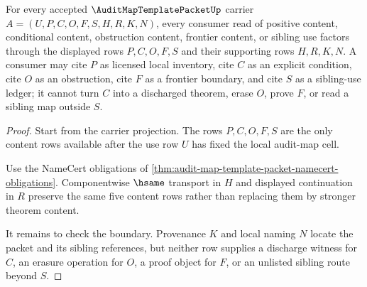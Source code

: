 \begin{theorem}
\label{thm:audit-map-template-packet-positive-conditional-obstruction-frontier}
For every accepted $\AuditMapTemplatePacketUp$ carrier $A=(U,P,C,O,F,S,H,R,K,N)$, every consumer read of positive content, conditional content, obstruction content, frontier content, or sibling use factors through the displayed rows $P,C,O,F,S$ and their supporting rows $H,R,K,N$. A consumer may cite $P$ as licensed local inventory, cite $C$ as an explicit condition, cite $O$ as an obstruction, cite $F$ as a frontier boundary, and cite $S$ as a sibling-use ledger; it cannot turn $C$ into a discharged theorem, erase $O$, prove $F$, or read a sibling map outside $S$.
\end{theorem}
\begin{proof}
Start from the carrier projection. The rows $P,C,O,F,S$ are the only content rows available after the use row $U$ has fixed the local audit-map cell.

Use the NameCert obligations of \autoref{thm:audit-map-template-packet-namecert-obligations}. Componentwise $\hsame$ transport in $H$ and displayed continuation in $R$ preserve the same five content rows rather than replacing them by stronger theorem content.

It remains to check the boundary. Provenance $K$ and local naming $N$ locate the packet and its sibling references, but neither row supplies a discharge witness for $C$, an erasure operation for $O$, a proof object for $F$, or an unlisted sibling route beyond $S$.
\end{proof}

